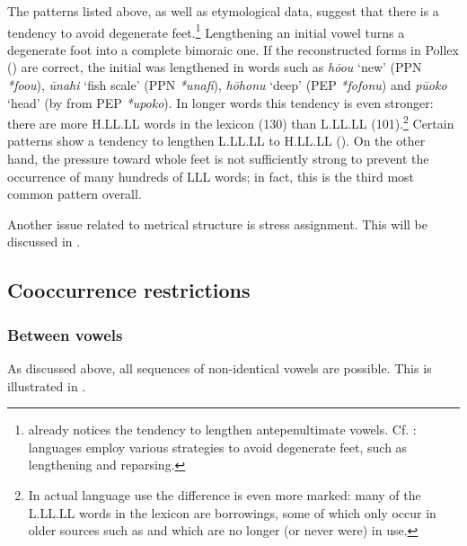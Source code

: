 The patterns listed above, as well as etymological data, suggest that there is a tendency to avoid degenerate feet.\footnote{\label{fn:51}\citet[17]{Englert1978} already notices the tendency to lengthen antepenultimate vowels. Cf. \citet[399]{Kager1995}: languages employ various strategies to avoid degenerate feet, such as lengthening and reparsing.} Lengthening an initial vowel turns a degenerate foot into a complete bimoraic one. If the reconstructed forms in Pollex (\citealt{GreenhillClark2011}) are correct, the initial  was lengthened in words such as \textit{\mbox{hō{\ꞌ}ou}} ‘new’ (PPN \textit{\mbox{*fo{\ꞌ}ou}}), \textit{{\ꞌ}ūnahi} ‘fish scale’ (PPN \textit{*{\ꞌ}unafi}), \textit{hōhonu} ‘deep’ (PEP \textit{*fofonu}) and \textit{pū{\ꞌ}oko} ‘head’ (by  from PEP \textit{*upoko}). In longer words this tendency is even stronger: there are more H.LL.LL words in the lexicon (130) than L.LL.LL (101).\footnote{\label{fn:52}In actual language use the difference is even more marked: many of the L.LL.LL words in the lexicon are borrowings, some of which only occur in older sources such as \citet{Roussel1908} and which are no longer (or never were) in use.} Certain  patterns show a tendency to lengthen L.LL.LL to H.LL.LL (). On the other hand, the pressure toward whole feet is not sufficiently strong to prevent the occurrence of many hundreds of LLL words; in fact, this is the third most common pattern overall.

Another issue related to metrical structure is stress assignment. This will be discussed in .

\largerpage
\subsection{Cooccurrence restrictions}\label{sec:2.3.3}
\subsubsection{Between vowels}\label{sec:2.3.3.1}
As discussed above, all sequences of non-identical vowels are possible. This is illustrated in .

